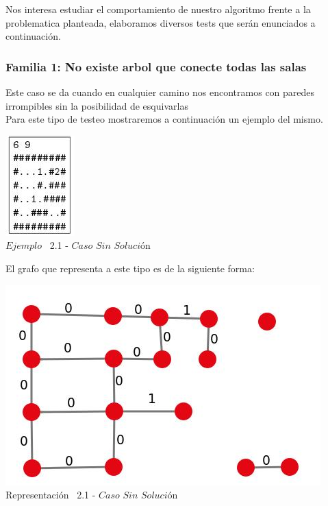 \indent Nos interesa estudiar el comportamiento de nuestro algoritmo frente a la problematica planteada, elaboramos diversos tests que ser\'an enunciados a continuaci\'on.\\

\begin{center}
 \subsubsection*{Familia 1: No existe arbol que conecte todas las salas}
\end{center}

Este caso se da cuando en cualquier camino nos encontramos con paredes irrompibles sin la posibilidad de esquivarlas\\

 Para este tipo de testeo mostraremos a continuaci\'on un ejemplo del mismo.\\
 
\vspace*{0.3cm} \vspace*{0.3cm}
  \begin{center}
 \includegraphics[scale=1.6]{./EJ2/ej2sinsolucion.jpeg}
\\{$Ejemplo$ \ 2.1 - $Caso$ $Sin$ $Soluci$\'on}
  \end{center}
  \vspace*{0.3cm}

El grafo que representa a este tipo es de la siguiente forma:\\

\vspace*{0.3cm} \vspace*{0.3cm}
  \begin{center}
 \includegraphics[scale=0.5]{./EJ2/ej2grafosinsolucion.jpeg}
 \\{Representación \ 2.1 - $Caso$ $Sin$ $Soluci$\'on}
  \end{center}
  \vspace*{0.3cm}

